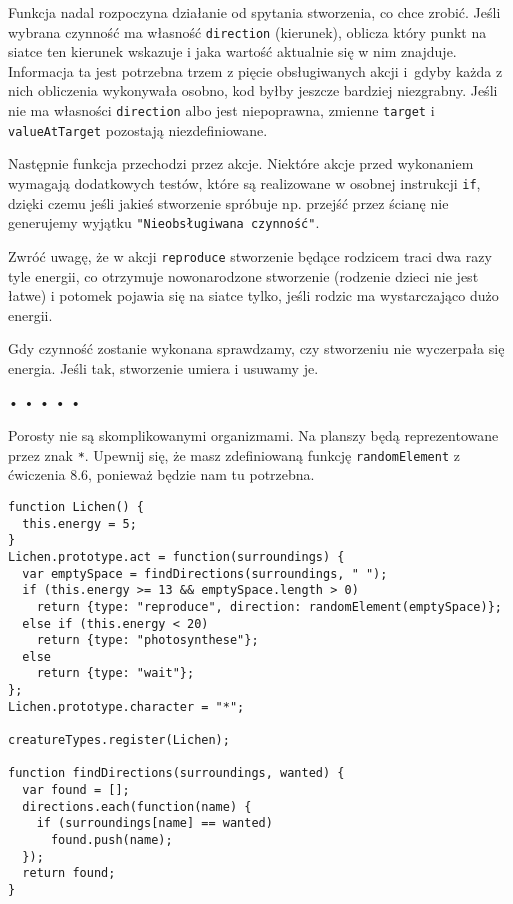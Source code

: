 Funkcja nadal rozpoczyna działanie od spytania stworzenia, co chce zrobić. Jeśli wybrana czynność ma własność \texttt{direction} (kierunek), oblicza który punkt na siatce ten kierunek wskazuje i jaka wartość aktualnie się w nim znajduje. Informacja ta jest potrzebna trzem z pięcie obsługiwanych akcji i~gdyby każda z nich obliczenia wykonywała osobno, kod byłby jeszcze bardziej niezgrabny. Jeśli nie ma własności \texttt{direction} albo jest niepoprawna, zmienne \texttt{target} i \texttt{valueAtTarget} pozostają niezdefiniowane.

  
Następnie funkcja przechodzi przez akcje. Niektóre akcje przed wykonaniem wymagają dodatkowych testów, które są realizowane w osobnej instrukcji \texttt{if}, dzięki czemu jeśli jakieś stworzenie spróbuje np. przejść przez ścianę nie generujemy wyjątku \texttt{"Nieobsługiwana czynność"}.

  
Zwróć uwagę, że w akcji \texttt{reproduce} stworzenie będące rodzicem traci dwa razy tyle energii, co otrzymuje nowonarodzone stworzenie (rodzenie dzieci nie jest łatwe) i potomek pojawia się na siatce tylko, jeśli rodzic ma wystarczająco dużo energii.

  
Gdy czynność zostanie wykonana sprawdzamy, czy stworzeniu nie wyczerpała się energia. Jeśli tak, stworzenie umiera i usuwamy je.



\begin{center}
• • • • •
\end{center}

  
Porosty nie są skomplikowanymi organizmami. Na planszy będą reprezentowane przez znak \texttt{*}. Upewnij się, że masz zdefiniowaną funkcję \texttt{randomElement} z ćwiczenia 8.6, ponieważ będzie nam tu potrzebna.

  
\begin{verbatim} 
function Lichen() {
  this.energy = 5;
}
Lichen.prototype.act = function(surroundings) {
  var emptySpace = findDirections(surroundings, " ");
  if (this.energy >= 13 && emptySpace.length > 0)
    return {type: "reproduce", direction: randomElement(emptySpace)};
  else if (this.energy < 20)
    return {type: "photosynthese"};
  else
    return {type: "wait"};
};
Lichen.prototype.character = "*";

creatureTypes.register(Lichen);

function findDirections(surroundings, wanted) {
  var found = [];
  directions.each(function(name) {
    if (surroundings[name] == wanted)
      found.push(name);
  });
  return found;
}
 \end{verbatim}
  
